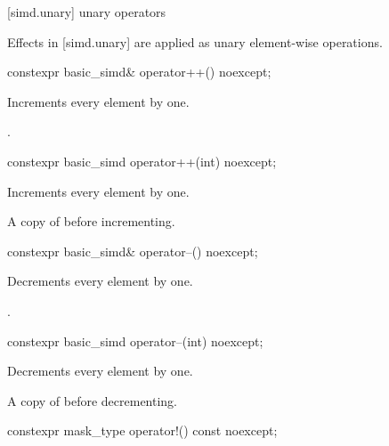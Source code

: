 [simd.unary]{ unary operators}

\pnum
Effects in [simd.unary] are applied as unary element-wise operations.

\begin{itemdecl}
constexpr basic_simd& operator++() noexcept;
\end{itemdecl}

\begin{itemdescr}
  \pnum{}

  \pnum\effects
  Increments every element by one.

  \pnum\returns
  .
\end{itemdescr}

\begin{itemdecl}
constexpr basic_simd operator++(int) noexcept;
\end{itemdecl}

\begin{itemdescr}
  \pnum{}

  \pnum\effects
  Increments every element by one.

  \pnum\returns
  A copy of  before incrementing.
\end{itemdescr}

\begin{itemdecl}
constexpr basic_simd& operator--() noexcept;
\end{itemdecl}

\begin{itemdescr}
  \pnum{}

  \pnum\effects
  Decrements every element by one.

  \pnum\returns
  .
\end{itemdescr}

\begin{itemdecl}
constexpr basic_simd operator--(int) noexcept;
\end{itemdecl}

\begin{itemdescr}
  \pnum{}

  \pnum\effects
  Decrements every element by one.

  \pnum\returns
  A copy of  before decrementing.
\end{itemdescr}

\begin{itemdecl}
constexpr mask_type operator!() const noexcept;
\end{itemdecl}


